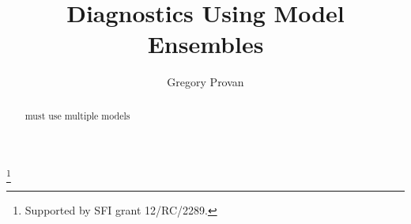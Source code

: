 \documentclass{ifacconf}
\begin{document}
\begin{frontmatter}

\title{Diagnostics Using Model Ensembles}

\thanks[footnoteinfo]{Supported  by SFI grant 12/RC/2289.}

\author[First]{Gregory Provan}

\address[First]{Department of Computer Science, University College Cork, Cork, Ireland (Tel: 353-21-490-1816; e-mail: g.provan@ cs.ucc.ie).}







\begin{abstract}
must use multiple models
\end{abstract}
\end{frontmatter}

%









%


%
%
%
\end{document}
